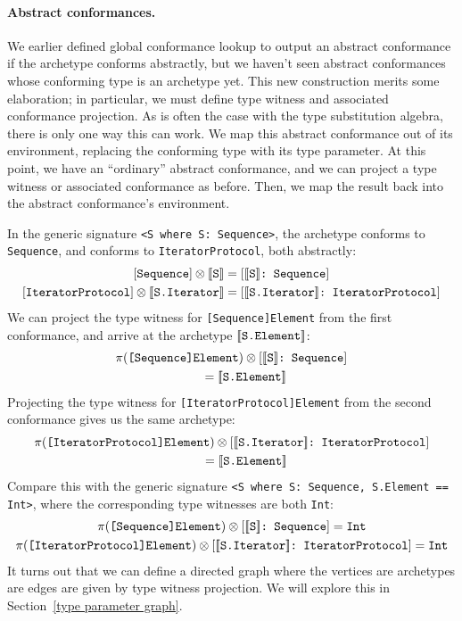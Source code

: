 \documentclass[../generics]{subfiles}
\begin{document}
\paragraph{Abstract conformances.}
We earlier defined global conformance lookup to output an abstract conformance if the archetype conforms abstractly, but we haven't seen abstract conformances whose conforming type is an archetype yet. This new construction merits some elaboration; in particular, we must define type witness and associated conformance projection. As is often the case with the type substitution algebra, there is only one way this can work. We map this abstract conformance out of its environment, replacing the conforming type with its type parameter. At this point, we have an ``ordinary'' abstract conformance, and we can project a type witness or associated conformance as before. Then, we map the result back into the abstract conformance's environment.

In the generic signature \verb|<S where S: Sequence>|, the archetype  conforms to \texttt{Sequence}, and  conforms to \texttt{IteratorProtocol}, both abstractly:
\begin{gather*}
\Proto{Sequence}\otimes \archetype{S} = \ConfReq{$\archetype{S}$}{Sequence}\\
\Proto{IteratorProtocol}\otimes \archetype{S.Iterator} = \ConfReq{$\archetype{S.Iterator}$}{IteratorProtocol}
\end{gather*}
We can project the type witness for \texttt{[Sequence]Element} from the first conformance, and arrive at the archetype $[\![\texttt{S.Element}]\!]$:
\begin{gather*}
\pi(\texttt{[Sequence]Element}) \otimes [\texttt{$[\![\texttt{S}]\!]$:~Sequence}]\\
\qquad {} = [\![\texttt{S.Element}]\!]
\end{gather*}
Projecting the type witness for \texttt{[IteratorProtocol]Element} from the second conformance gives us the same archetype:
\begin{gather*}
\pi(\texttt{[IteratorProtocol]Element})\otimes [\texttt{$[\![\texttt{S.Iterator}]\!]$:~IteratorProtocol}]\\
\qquad {} = [\![\texttt{S.Element}]\!] 
\end{gather*}
Compare this with the generic signature \verb|<S where S: Sequence, S.Element == Int>|, where the corresponding type witnesses are both \texttt{Int}:
\begin{gather*}
\pi(\texttt{[Sequence]Element}) \otimes [\texttt{$[\![\texttt{S}]\!]$:~Sequence}] = \texttt{Int} \\
\pi(\texttt{[IteratorProtocol]Element})\otimes [\texttt{$[\![\texttt{S.Iterator}]\!]$:~IteratorProtocol}] = \texttt{Int}
\end{gather*}
It turns out that we can define a directed graph where the vertices are archetypes are edges are given by type witness projection. We will explore this in Section~\ref{type parameter graph}.
\end{document}
